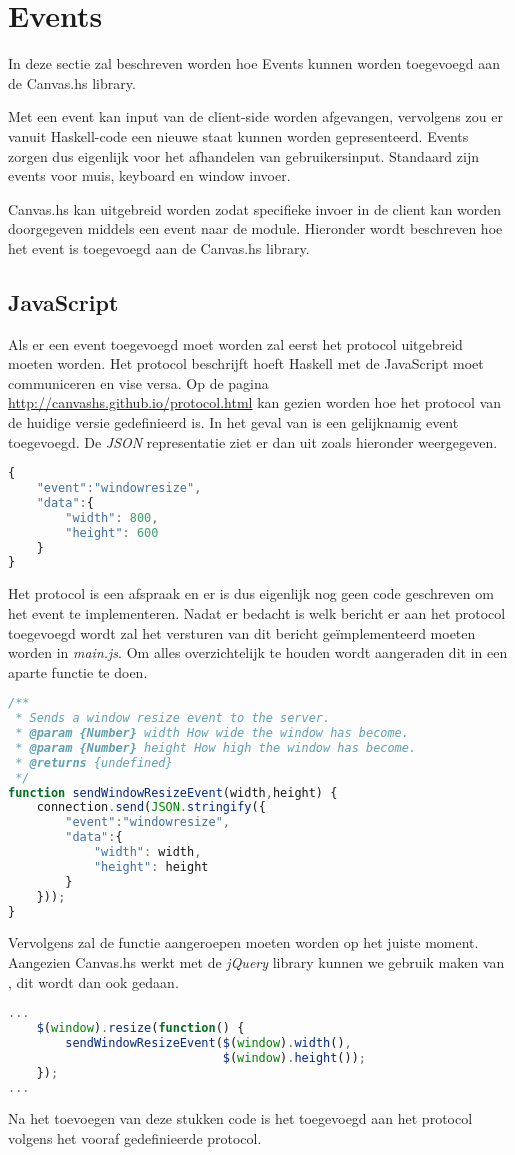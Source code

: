 \section{Events}
In deze sectie zal beschreven worden hoe Events kunnen worden toegevoegd aan de Canvas.hs library.

Met een event kan input van de client-side worden afgevangen, vervolgens zou er vanuit Haskell-code een nieuwe staat kunnen worden gepresenteerd. Events zorgen dus eigenlijk voor het afhandelen van gebruikersinput. Standaard zijn events voor muis, keyboard en window invoer.

Canvas.hs kan uitgebreid worden zodat specifieke invoer in de client kan worden doorgegeven middels een event naar de module. Hieronder wordt beschreven hoe het  event is toegevoegd aan de Canvas.hs library.
\subsection{JavaScript}
Als er een event toegevoegd moet worden zal eerst het protocol uitgebreid moeten worden. Het protocol beschrijft hoeft Haskell met de JavaScript moet communiceren en vise versa. Op de pagina \url{http://canvashs.github.io/protocol.html} kan gezien worden hoe het protocol van de huidige versie gedefinieerd is. In het geval van  is een gelijknamig event toegevoegd. De \emph{JSON} representatie ziet er dan uit zoals hieronder weergegeven.
\begin{lstlisting}[language=JavaScript]
{
    "event":"windowresize",
    "data":{
        "width": 800,
        "height": 600
    }
}
\end{lstlisting}
Het protocol is een afspraak en er is dus eigenlijk nog geen code geschreven om het event te implementeren. Nadat er bedacht is welk bericht er aan het protocol toegevoegd wordt zal het versturen van dit bericht ge\"implementeerd moeten worden in \emph{main.js}. Om alles overzichtelijk te houden wordt aangeraden dit in een aparte functie te doen.
\begin{lstlisting}[language=JavaScript]
/**
 * Sends a window resize event to the server.
 * @param {Number} width How wide the window has become.
 * @param {Number} height How high the window has become.
 * @returns {undefined}
 */
function sendWindowResizeEvent(width,height) {
    connection.send(JSON.stringify({
        "event":"windowresize",
        "data":{
            "width": width,
            "height": height
        }
    }));
}
\end{lstlisting}
Vervolgens zal de functie  aangeroepen moeten worden op het juiste moment. Aangezien Canvas.hs werkt met de \emph{jQuery} library kunnen we gebruik maken van , dit wordt dan ook gedaan.
\begin{lstlisting}[language=JavaScript]
...
    $(window).resize(function() {
        sendWindowResizeEvent($(window).width(),
        					  $(window).height());
    });
...
\end{lstlisting}
Na het toevoegen van deze stukken code is het  toegevoegd aan het protocol volgens het vooraf gedefinieerde protocol.

